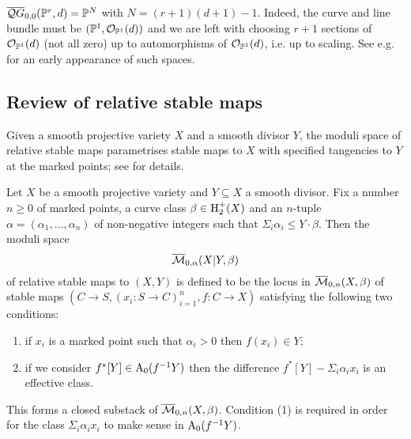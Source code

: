 \begin{example} $\overline{\mathcal QG}_{0,0}(\mathbb P^r,d) = \mathbb P^N$ with $N=(r+1)(d+1)-1$. Indeed, the curve and line bundle must be $(\mathbb P^1,\mathcal O_{\mathbb P^1}(d))$ and we are left with choosing $r+1$ sections of $\mathcal O_{\mathbb P^1}(d)$ (not all zero) up to automorphisms of $\mathcal O_{\mathbb P^1}(d)$, i.e. up to scaling. See e.g. \cite{Bertram} for an early appearance of such spaces.\end{example}

\subsection{Review of relative stable maps} \label{Subsection relative stable maps} Given a smooth projective variety $X$ and a smooth divisor $Y$, the moduli space of relative stable maps parametrises stable maps to $X$ with specified tangencies to $Y$ at the marked points; see \cite{Ga} for details.

\begin{definition}[{\cite[Definition 1.1]{Ga}}] Let $X$ be a smooth projective variety and $Y \subseteq X$ a smooth divisor. Fix a number $n \geq 0$ of marked points, a curve class $\beta \in \operatorname{H}_2^+(X)$ and an $n$-tuple $\alpha = (\alpha_1, \ldots, \alpha_n)$ of non-negative integers such that $\Sigma_i \alpha_i \leq Y \cdot \beta$. Then the moduli space
\begin{equation*} \overline{\mathcal M}_{0,\alpha}(X|Y,\beta) \end{equation*}
of relative stable maps to $(X,Y)$ is defined to be the locus in $\overline{\mathcal M}_{0,n}(X,\beta)$ of stable maps $(C \to S , (x_i : S \to C)_{i=1}^n , f : C \to X)$ satisfying the following two conditions:
\begin{enumerate}
\item if $x_i$ is a marked point such that $\alpha_i > 0$ then $f(x_i) \in Y$;
\item if we consider $f^* [Y] \in \operatorname{A}_0(f^{-1}Y)$ then the difference $f^* [Y] - \Sigma_i \alpha_i x_i$ is an effective class.
\end{enumerate}
This forms a closed substack of $\overline{\mathcal M}_{0,n}(X,\beta)$. Condition (1) is required in order for the class $\Sigma_i \alpha_i x_i$ to make sense in $\operatorname{A}_0(f^{-1}Y)$.
\end{definition}

